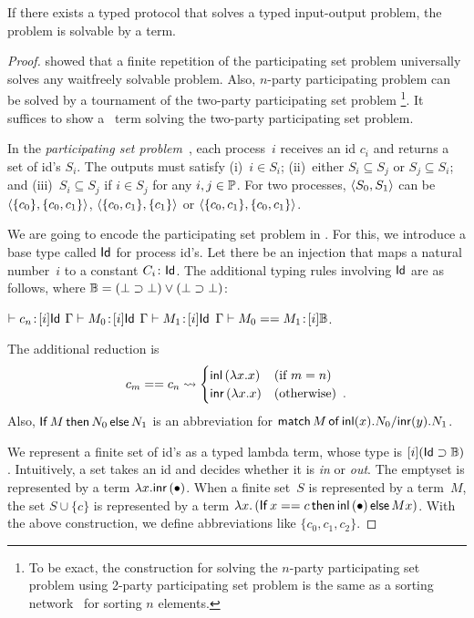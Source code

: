 \begin{theorem}
If there exists a typed protocol that solves a typed input-output
 problem,
the problem is solvable by a term.
\end{theorem}

\begin{proof}
\citet{herlihy1999topological} showed that a finite repetition
 of the participating set
 problem universally solves any waitfreely solvable problem.
 Also, $n$-party participating problem can be solved by a tournament of
 the two-party participating set problem%
 \footnote{To be exact, the construction for solving the $n$-party
 participating set problem using 2-party participating set problem
 is the same as a sorting network~\citep{batcher1968} for sorting $n$
 elements.}.
 It suffices to show a \lgd\, term solving the two-party participating
 set problem.

In the \textit{participating set problem}~\cite{borowsky},
each process~$i$ receives an id $c_i$ and
returns a set of id's $S_i$.
The outputs must satisfy (i)~$i\in S_i$; (ii)~either $S_i\subseteq S_j$
or $S_j\subseteq S_i$; and (iii)~$S_i\subseteq S_j$  if $i\in S_j$ for any
$i,j\in\mathbb{P}$.
For two processes,
$\langle{S_0, S_1}\rangle$ can be $\langle{\{c_0\}, \{c_0, c_1\}}\rangle$, $\langle{\{c_0, c_1\}, \{c_1\}}\rangle$
or
$\langle{\{c_0, c_1\}, \{c_0, c_1\}}\rangle$.

We are going to encode the participating set problem in \lgd.
For this, we introduce a base type called $\mathsf{Id}$ for process id's.
Let there be an injection that maps a natural number~$i$ to a constant
$C_i\colon\mathsf{Id}$.
The additional typing rules involving $\mathsf{Id}$ are as follows, where $\mathbb{B} = (\bot\supset\bot)\vee(\bot\supset\bot)$:
\begin{center}
 \UnaryRule{}{}
 {$\vdash {c_n} \mathord{\colon\kern -2pt}{[i]\mathsf{Id}}$}
 \hfill
 \BinaryRule
 {$\Gamma\vdash {M_0} \mathord{\colon\kern -2pt}{[}i]\mathsf{Id}$}
 {$\Gamma\vdash {M_1} \mathord{\colon\kern -2pt}{[}i]\mathsf{Id}$}
 {}
 {$\Gamma \vdash {{M_0} == {M_1}} \mathord{\colon\kern -2pt}{[i]\mathbb{B}}$}\enspace.
\end{center}
The additional reduction is
\[
 c_m == c_n \rightsquigarrow
\begin{cases}
 \mathsf{inl}\left({\lambda x.x}\right)& (\text{if } m = n)\\
 \mathsf{inr}\left({\lambda x.x}\right)& (\text{otherwise})\enspace.
\end{cases}
\]
Also,
${\mathsf{If}\, {M}\, \mathsf{then}\, {N_0}\, \mathsf{else}\, {N_1}}$
is an abbreviation for
${\mathsf{match}\,{M}\,\mathsf{of}\, \mathsf{inl}({x}). {N_0}/ \mathsf{inr}({y}). {N_1}}$.

We represent a finite set of id's as a
typed lambda term, whose type is $[i](\mathsf{Id}\supset \mathbb{B})$.  Intuitively, a
set takes an id and decides whether it is \textit{in} or \textit{out}.
The emptyset is represented by a term $\lambda x. \mathsf{inr}\left({\bullet}\right)$.
When a finite set~$S$ is represented by a term~$M$,
the set $S \cup \{c\}$ is represented by a term
$\lambda x.\left(\mathsf{If}\, {x==c}\, \mathsf{then}\, {\mathsf{inl}\left({\bullet}\right)}\, \mathsf{else}\, {Mx}\right)$.
With the above construction, we define abbreviations
like $\{c_0, c_1, c_2\}$.


\end{proof}
